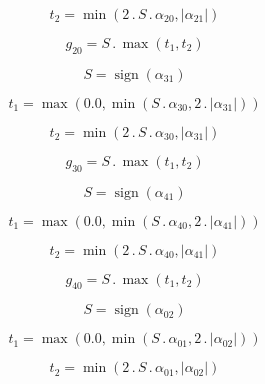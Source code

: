 \documentclass{article}
\begin{document}
\begin{dmath}t_{2} = \min\left(2 \,.\, S \,.\, \alpha_{20}, \left|{\alpha_{21}}\right|\right)\end{dmath}

\begin{dmath}g_{20} = S \,.\, \max\left(t_{1}, t_{2}\right)\end{dmath}

\begin{dmath}S = \operatorname{sign}{\left (\alpha_{31} \right )}\end{dmath}

\begin{dmath}t_{1} = \max\left(0.0, \min\left(S \,.\, \alpha_{30}, 2 \,.\, \left|{\alpha_{31}}\right|\right)\right)\end{dmath}

\begin{dmath}t_{2} = \min\left(2 \,.\, S \,.\, \alpha_{30}, \left|{\alpha_{31}}\right|\right)\end{dmath}

\begin{dmath}g_{30} = S \,.\, \max\left(t_{1}, t_{2}\right)\end{dmath}

\begin{dmath}S = \operatorname{sign}{\left (\alpha_{41} \right )}\end{dmath}

\begin{dmath}t_{1} = \max\left(0.0, \min\left(S \,.\, \alpha_{40}, 2 \,.\, \left|{\alpha_{41}}\right|\right)\right)\end{dmath}

\begin{dmath}t_{2} = \min\left(2 \,.\, S \,.\, \alpha_{40}, \left|{\alpha_{41}}\right|\right)\end{dmath}

\begin{dmath}g_{40} = S \,.\, \max\left(t_{1}, t_{2}\right)\end{dmath}

\begin{dmath}S = \operatorname{sign}{\left (\alpha_{02} \right )}\end{dmath}

\begin{dmath}t_{1} = \max\left(0.0, \min\left(S \,.\, \alpha_{01}, 2 \,.\, \left|{\alpha_{02}}\right|\right)\right)\end{dmath}

\begin{dmath}t_{2} = \min\left(2 \,.\, S \,.\, \alpha_{01}, \left|{\alpha_{02}}\right|\right)\end{dmath}
\end{document}
